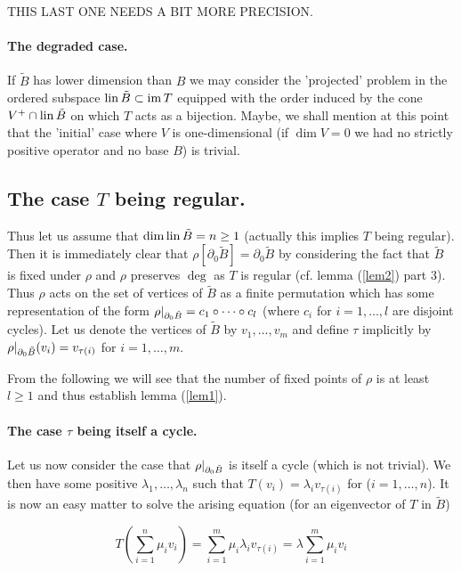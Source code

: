 \documentclass{article}
\begin{document}
THIS LAST ONE NEEDS A BIT MORE PRECISION. 

\paragraph{The degraded case.} If $\tilde{B}$ has lower dimension than $B$ we may consider the 'projected' problem in the ordered subspace $\operatorname{lin}\tilde{B}\subset\operatorname{im}{T}$ equipped with the order induced by the cone $V^+\cap\operatorname{lin}\tilde{B}$ on which $T$ acts as a bijection. 
Maybe, we shall mention at this point that the 'initial' case where $V$ is one-dimensional (if $\dim V=0$ we had no strictly positive operator and no base $B$) is trivial. 

\subsection{The case $T$ being regular.}
Thus let us assume that $\dim\operatorname{lin}\tilde{B}=n\geq 1$ (actually this implies $T$ being regular). 
Then it is immediately clear that $\rho[\partial_0{\tilde{B}}]=\partial_0{\tilde{B}}$ by considering the fact that $\tilde{B}$ is fixed under $\rho$ and $\rho$ preserves $\deg$ as $T$ is regular (cf. lemma (\ref{lem2}) part 3). 
Thus $\rho$ acts on the set of vertices of $\tilde{B}$ as a finite permutation which has some representation of the form $\rho\vert_{\partial_0{\tilde{B}}}=c_1\circ\cdots\circ c_l$ (where $c_i$ for $i=1,\ldots,l$ are disjoint cycles). 
Let us denote the vertices of $\tilde{B}$ by $v_1,\ldots,v_m$ and define $\tau$ implicitly by $\rho\vert_{\partial_0{\tilde{B}}}(v_i)=v_{\tau(i)}$ for $i=1,\ldots,m$. 

From the following we will see that the number of fixed points of $\rho$ is at least $l\geq 1$ and thus establish lemma (\ref{lem1}).

\paragraph{The case $\tau$ being itself a cycle.}

Let us now consider the case that $\rho\vert_{\partial_0{\tilde{B}}}$ is itself a cycle (which is not trivial). 
We then have some positive $\lambda_1,\ldots,\lambda_n$ such that $T(v_i)=\lambda_iv_{\tau(i)}$ for ($i=1,\ldots,n$). 
It is now an easy matter to solve the arising equation (for an eigenvector of $T$ in $\tilde{B}$)

\begin{equation}
T\left(\sum_{i=1}^n\mu_iv_i\right)=\sum_{i=1}^m\mu_i\lambda_iv_{\tau(i)}=\lambda \sum_{i=1}^m\mu_iv_i
\end{equation}
\end{document}

